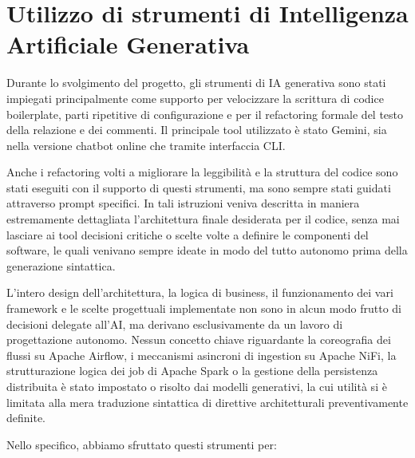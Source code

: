 \documentclass[conference]{IEEEtran}
\begin{document}
\clearpage
\onecolumn


\clearpage


\appendices

\section{Utilizzo di strumenti di Intelligenza Artificiale Generativa}\label{sec:appendix_ai_declaration}

Durante lo svolgimento del progetto, gli strumenti di IA generativa sono stati impiegati principalmente come supporto per velocizzare la scrittura di codice boilerplate, parti ripetitive di configurazione e per il refactoring formale del testo della relazione e dei commenti.
Il principale tool utilizzato è stato Gemini, sia nella versione chatbot online che tramite interfaccia CLI.

Anche i refactoring volti a migliorare la leggibilità e la struttura del codice sono stati eseguiti con il supporto di questi strumenti, ma sono sempre stati guidati attraverso prompt specifici.
In tali istruzioni veniva descritta in maniera estremamente dettagliata l'architettura finale desiderata per il codice, senza mai lasciare ai tool decisioni critiche o scelte volte a definire le componenti del software, le quali venivano sempre ideate in modo del tutto autonomo prima della generazione sintattica.

L'intero design dell'architettura, la logica di business, il funzionamento dei vari framework e le scelte progettuali implementate non sono in alcun modo frutto di decisioni delegate all'AI, ma derivano esclusivamente da un lavoro di progettazione autonomo.
Nessun concetto chiave riguardante la coreografia dei flussi su Apache Airflow, i meccanismi asincroni di ingestion su Apache NiFi, la strutturazione logica dei job di Apache Spark o la gestione della persistenza distribuita è stato impostato o risolto dai modelli generativi, la cui utilità si è limitata alla mera traduzione sintattica di direttive architetturali preventivamente definite.

Nello specifico, abbiamo sfruttato questi strumenti per:
\end{document}
